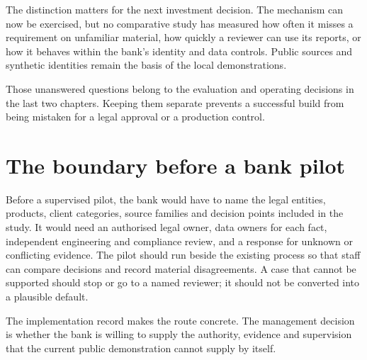 The distinction matters for the next investment decision. The mechanism can now
be exercised, but no comparative study has measured how often it misses a
requirement on unfamiliar material, how quickly a reviewer can use its reports,
or how it behaves within the bank's identity and data controls. Public sources
and synthetic identities remain the basis of the local demonstrations.

Those unanswered questions belong to the evaluation and operating decisions in
the last two chapters. Keeping them separate prevents a successful build from
being mistaken for a legal approval or a production control.

\section{The boundary before a bank pilot}

Before a supervised pilot, the bank would have to name the legal entities,
products, client categories, source families and decision points included in the
study. It would need an authorised legal owner, data owners for each fact,
independent engineering and compliance review, and a response for unknown or
conflicting evidence. The pilot should run beside the existing process so that
staff can compare decisions and record material disagreements. A case that cannot
be supported should stop or go to a named reviewer; it should not be converted
into a plausible default.

The implementation record makes the route concrete. The management decision is
whether the bank is willing to supply the authority, evidence and supervision
that the current public demonstration cannot supply by itself.
